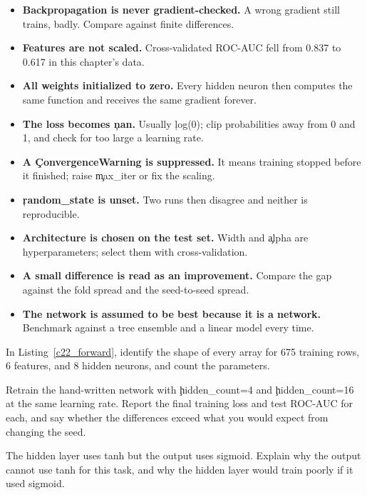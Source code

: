 \begin{itemize}
    \item \textbf{Backpropagation is never gradient-checked.} A wrong gradient
          still trains, badly. Compare against finite differences.
    \item \textbf{Features are not scaled.} Cross-validated ROC-AUC fell from
          0.837 to 0.617 in this chapter's data.
    \item \textbf{All weights initialized to zero.} Every hidden neuron then
          computes the same function and receives the same gradient forever.
    \item \textbf{The loss becomes \c{nan}.} Usually \c{log(0)}; clip
          probabilities away from 0 and 1, and check for too large a learning
          rate.
    \item \textbf{A \c{ConvergenceWarning} is suppressed.} It means training
          stopped before it finished; raise \c{max_iter} or fix the scaling.
    \item \textbf{\c{random_state} is unset.} Two runs then disagree and neither
          is reproducible.
    \item \textbf{Architecture is chosen on the test set.} Width and \c{alpha}
          are hyperparameters; select them with cross-validation.
    \item \textbf{A small difference is read as an improvement.} Compare the gap
          against the fold spread and the seed-to-seed spread.
    \item \textbf{The network is assumed to be best because it is a network.}
          Benchmark against a tree ensemble and a linear model every time.
\end{itemize}



In Listing~\ref{c22_forward}, identify the shape of every array for 675 training
rows, 6 features, and 8 hidden neurons, and count the parameters.


Retrain the hand-written network with \c{hidden_count=4} and \c{hidden_count=16}
at the same learning rate. Report the final training loss and test ROC-AUC for
each, and say whether the differences exceed what you would expect from changing
the seed.


The hidden layer uses tanh but the output uses sigmoid. Explain why the output
cannot use tanh for this task, and why the hidden layer would train poorly if it
used sigmoid.

